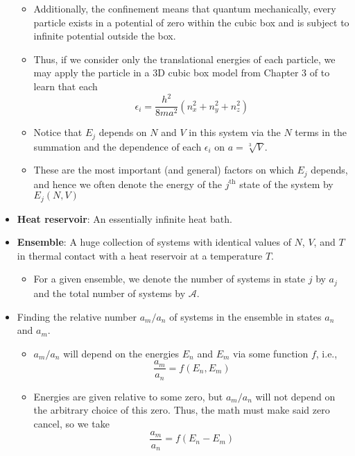\documentclass[../notes.tex]{subfiles}
\begin{document}
\begin{itemize}
\begin{itemize}
        \item Additionally, the confinement means that quantum mechanically, every particle exists in a potential of zero within the cubic box and is subject to infinite potential outside the box.
        \item Thus, if we consider only the translational energies of each particle, we may apply the particle in a 3D cubic box model from Chapter 3 of \textcite{bib:McQuarrieSimon} to learn that each
        \begin{equation*}
            \epsilon_i = \frac{h^2}{8ma^2}(n_x^2+n_y^2+n_z^2)
        \end{equation*}
        \item Notice that $E_j$ depends on $N$ and $V$ in this system via the $N$ terms in the summation and the dependence of each $\epsilon_i$ on $a=\sqrt[3]{V}$.
        \item These are the most important (and general) factors on which $E_j$ depends, and hence we often denote the energy of the $j^\text{th}$ state of the system by $E_j(N,V)$
    \end{itemize}
    \item \textbf{Heat reservoir}: An essentially infinite heat bath.
    \item \textbf{Ensemble}: A huge collection of systems with identical values of $N$, $V$, and $T$ in thermal contact with a heat reservoir at a temperature $T$.
    \begin{itemize}
        \item For a given ensemble, we denote the number of systems in state $j$ by $a_j$ and the total number of systems by $\mathcal{A}$.
    \end{itemize}
    \item Finding the relative number $a_m/a_n$ of systems in the ensemble in states $a_n$ and $a_m$.
    \begin{itemize}
        \item $a_m/a_n$ will depend on the energies $E_n$ and $E_m$ via some function $f$, i.e.,
        \begin{equation*}
            \frac{a_m}{a_n} = f(E_n,E_m)
        \end{equation*}
        \item Energies are given relative to some zero, but $a_m/a_n$ will not depend on the arbitrary choice of this zero. Thus, the math must make said zero cancel, so we take
        \begin{equation*}
            \frac{a_m}{a_n} = f(E_n-E_m)

\end{equation*}
\end{itemize}
\end{itemize}
\end{document}

